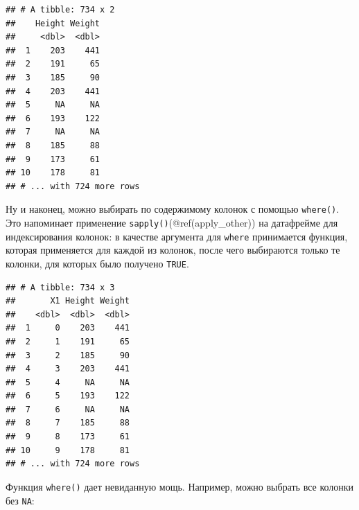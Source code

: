 \documentclass[
]{book}
\newenvironment{Shaded}{\begin{snugshade}}{\end{snugshade}}
\newcommand{\ControlFlowTok}[1]{\textcolor[rgb]{0.13,0.29,0.53}{\textbf{#1}}}
\newcommand{\KeywordTok}[1]{\textcolor[rgb]{0.13,0.29,0.53}{\textbf{#1}}}
\newcommand{\NormalTok}[1]{#1}
\newcommand{\OperatorTok}[1]{\textcolor[rgb]{0.81,0.36,0.00}{\textbf{#1}}}
\newcommand{\StringTok}[1]{\textcolor[rgb]{0.31,0.60,0.02}{#1}}
\begin{document}
\begin{Shaded}
\end{Shaded}

\begin{verbatim}
## # A tibble: 734 x 2
##    Height Weight
##     <dbl>  <dbl>
##  1    203    441
##  2    191     65
##  3    185     90
##  4    203    441
##  5     NA     NA
##  6    193    122
##  7     NA     NA
##  8    185     88
##  9    173     61
## 10    178     81
## # ... with 724 more rows
\end{verbatim}

Ну и наконец, можно выбирать по содержимому колонок с помощью \texttt{where()}. Это напоминает применение \texttt{sapply()}(@ref(apply\_other)) на датафрейме для индексирования колонок: в качестве аргумента для \texttt{where} принимается функция, которая применяется для каждой из колонок, после чего выбираются только те колонки, для которых было получено \texttt{TRUE}.

\begin{Shaded}
\end{Shaded}

\begin{verbatim}
## # A tibble: 734 x 3
##       X1 Height Weight
##    <dbl>  <dbl>  <dbl>
##  1     0    203    441
##  2     1    191     65
##  3     2    185     90
##  4     3    203    441
##  5     4     NA     NA
##  6     5    193    122
##  7     6     NA     NA
##  8     7    185     88
##  9     8    173     61
## 10     9    178     81
## # ... with 724 more rows
\end{verbatim}

Функция \texttt{where()} дает невиданную мощь. Например, можно выбрать все колонки без \texttt{NA}:

\begin{Shaded}
\end{Shaded}
\end{document}
